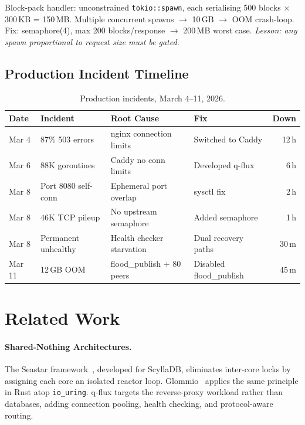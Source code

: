 \documentclass[a4paper, 11pt]{article}
\begin{document}
Block-pack handler: unconstrained \texttt{tokio::spawn}, each serialising 500 blocks $\times$ 300\,KB = 150\,MB. Multiple concurrent spawns $\to$ 10\,GB $\to$ OOM crash-loop. Fix: semaphore(4), max 200 blocks/response $\to$ 200\,MB worst case. \emph{Lesson: any spawn proportional to request size must be gated.}

\subsection{Production Incident Timeline}

\begin{table}[t]
\centering
\caption{Production incidents, March 4--11, 2026.}
\label{tab:incidents}
\small
\begin{tabular}{@{} l p{2.4cm} p{2.6cm} p{2.2cm} r @{}}
\toprule
\textbf{Date} & \textbf{Incident} & \textbf{Root Cause} & \textbf{Fix} & \textbf{Down} \\
\midrule
Mar 4  & 87\% 503 errors         & nginx connection limits        & Switched to Caddy      & 12\,h \\
Mar 6  & 88K goroutines          & Caddy no conn limits           & Developed q-flux       & 6\,h  \\
Mar 8  & Port 8080 self-conn     & Ephemeral port overlap         & sysctl fix             & 2\,h  \\
Mar 8  & 46K TCP pileup          & No upstream semaphore          & Added semaphore        & 1\,h  \\
Mar 8  & Permanent unhealthy     & Health checker starvation      & Dual recovery paths    & 30\,m \\
Mar 11 & 12\,GB OOM              & flood\_publish + 80 peers      & Disabled flood\_publish & 45\,m \\
\bottomrule
\end{tabular}
\end{table}


\section{Related Work}
\label{sec:related}

\paragraph{Shared-Nothing Architectures.}
The Seastar framework~\cite{seastar}, developed for ScyllaDB, eliminates inter-core locks by assigning each core an isolated reactor loop. Glommio~\cite{glommio} applies the same principle in Rust atop \texttt{io\_uring}. q-flux targets the reverse-proxy workload rather than databases, adding connection pooling, health checking, and protocol-aware routing.
\end{document}

